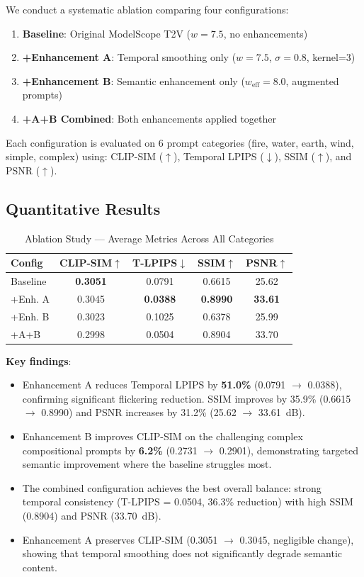\documentclass[conference]{IEEEtran}
\begin{document}
We conduct a systematic ablation comparing four configurations:

\begin{enumerate}
    \item \textbf{Baseline}: Original ModelScope T2V ($w = 7.5$, no enhancements)
    \item \textbf{+Enhancement A}: Temporal smoothing only ($w = 7.5$, $\sigma = 0.8$, kernel=3)
    \item \textbf{+Enhancement B}: Semantic enhancement only ($w_{\text{eff}} = 8.0$, augmented prompts)
    \item \textbf{+A+B Combined}: Both enhancements applied together
\end{enumerate}

Each configuration is evaluated on 6 prompt categories (fire, water, earth, wind, simple, complex) using: CLIP-SIM ($\uparrow$), Temporal LPIPS ($\downarrow$), SSIM ($\uparrow$), and PSNR ($\uparrow$).

\subsection{Quantitative Results}

\begin{table}[h]
\centering
\caption{Ablation Study — Average Metrics Across All Categories}
\begin{tabular}{lcccc}
\toprule
\textbf{Config} & \textbf{CLIP-SIM}$\uparrow$ & \textbf{T-LPIPS}$\downarrow$ & \textbf{SSIM}$\uparrow$ & \textbf{PSNR}$\uparrow$ \\
\midrule
Baseline & \textbf{0.3051} & 0.0791 & 0.6615 & 25.62 \\
+Enh. A & 0.3045 & \textbf{0.0388} & \textbf{0.8990} & \textbf{33.61} \\
+Enh. B & 0.3023 & 0.1025 & 0.6378 & 25.99 \\
+A+B & 0.2998 & 0.0504 & 0.8904 & 33.70 \\
\bottomrule
\end{tabular}
\label{tab:ablation}
\end{table}

\textbf{Key findings}:
\begin{itemize}
    \item Enhancement A reduces Temporal LPIPS by \textbf{51.0\%} (0.0791 $\to$ 0.0388), confirming significant flickering reduction. SSIM improves by 35.9\% (0.6615 $\to$ 0.8990) and PSNR increases by 31.2\% (25.62 $\to$ 33.61~dB).
    \item Enhancement B improves CLIP-SIM on the challenging complex compositional prompts by \textbf{6.2\%} (0.2731 $\to$ 0.2901), demonstrating targeted semantic improvement where the baseline struggles most.
    \item The combined configuration achieves the best overall balance: strong temporal consistency (T-LPIPS = 0.0504, 36.3\% reduction) with high SSIM (0.8904) and PSNR (33.70~dB).
    \item Enhancement A preserves CLIP-SIM (0.3051 $\to$ 0.3045, negligible change), showing that temporal smoothing does not significantly degrade semantic content.
\end{itemize}
\end{document}
